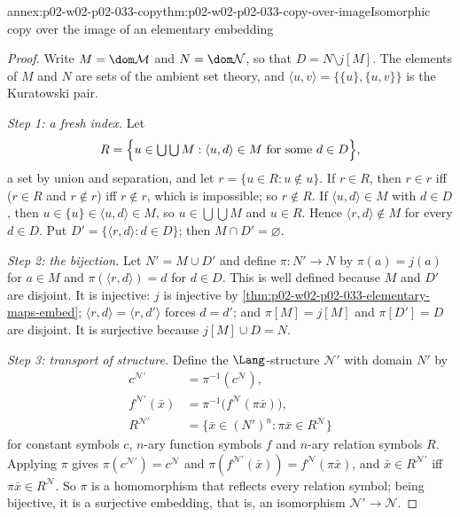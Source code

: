 \begin{annexitem}{annex:p02-w02-p02-033-copy}{thm:p02-w02-p02-033-copy-over-image}{Isomorphic copy over the image of an elementary embedding}
\begin{proof}
Write \(M=\dom\mathcal M\) and \(N=\dom\mathcal N\), so that
\(D=N\setminus j[M]\).  The elements of \(M\) and \(N\) are sets of the
ambient set theory, and \(\langle u,v\rangle=\{\{u\},\{u,v\}\}\) is the
Kuratowski pair.

\emph{Step 1: a fresh index.}  Let
\[
 R=\Bigl\{u\in\textstyle\bigcup\bigcup M:
 \langle u,d\rangle\in M\text{ for some }d\in D\Bigr\},
\]
a set by union and separation, and let \(r=\{u\in R:u\notin u\}\).  If
\(r\in R\), then \(r\in r\) iff (\(r\in R\) and \(r\notin r\)) iff
\(r\notin r\), which is impossible; so \(r\notin R\).  If
\(\langle u,d\rangle\in M\) with \(d\in D\), then \(u\in\{u\}\in
\langle u,d\rangle\in M\), so \(u\in\bigcup\bigcup M\) and \(u\in R\).
Hence \(\langle r,d\rangle\notin M\) for every \(d\in D\).  Put
\(D'=\{\langle r,d\rangle:d\in D\}\); then \(M\cap D'=\varnothing\).

\emph{Step 2: the bijection.}  Let \(N'=M\cup D'\) and define
\(\pi:N'\to N\) by \(\pi(a)=j(a)\) for \(a\in M\) and
\(\pi(\langle r,d\rangle)=d\) for \(d\in D\).  This is well defined because
\(M\) and \(D'\) are disjoint.  It is injective: \(j\) is injective by
\cref{thm:p02-w02-p02-033-elementary-maps-embed}; \(\langle r,d\rangle=
\langle r,d'\rangle\) forces \(d=d'\); and \(\pi[M]=j[M]\) and
\(\pi[D']=D\) are disjoint.  It is surjective because
\(j[M]\cup D=N\).

\emph{Step 3: transport of structure.}  Define the \(\Lang\)-structure
\(\mathcal N'\) with domain \(N'\) by
\[
\begin{aligned}
 c^{\mathcal N'}&=\pi^{-1}(c^{\mathcal N}),\\
 f^{\mathcal N'}(\bar x)&=\pi^{-1}\bigl(f^{\mathcal N}(\pi\bar x)\bigr),\\
 R^{\mathcal N'}&=\{\bar x\in(N')^n:\pi\bar x\in R^{\mathcal N}\}
\end{aligned}
\]
for constant symbols \(c\), \(n\)-ary function symbols \(f\) and \(n\)-ary
relation symbols \(R\).  Applying \(\pi\) gives
\(\pi(c^{\mathcal N'})=c^{\mathcal N}\) and
\(\pi(f^{\mathcal N'}(\bar x))=f^{\mathcal N}(\pi\bar x)\), and
\(\bar x\in R^{\mathcal N'}\) iff \(\pi\bar x\in R^{\mathcal N}\).  So
\(\pi\) is a homomorphism that reflects every relation symbol; being
bijective, it is a surjective embedding, that is, an isomorphism
\(\mathcal N'\to\mathcal N\).


\end{proof}
\end{annexitem}
